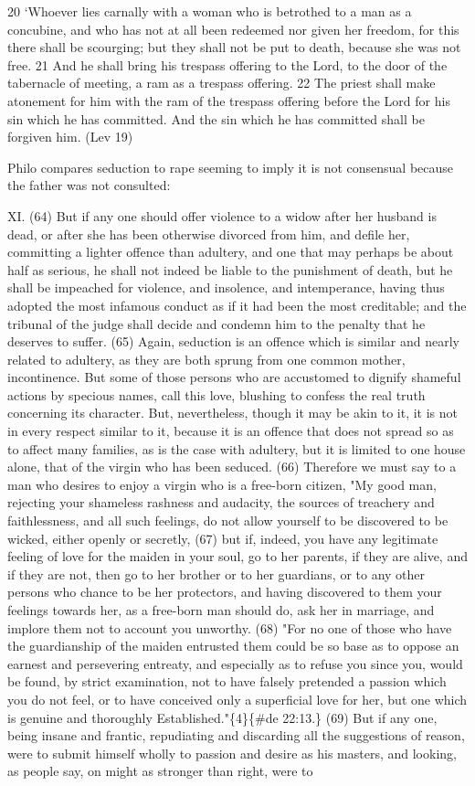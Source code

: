 \documentclass[11pt]{article}
\begin{document}
{20 ‘Whoever lies carnally with a woman who is betrothed to a man as a concubine, and who has not at all been redeemed nor given her freedom, for this there shall be scourging; but they shall not be put to death, because she was not free. 21 And he shall bring his trespass offering to the Lord, to the door of the tabernacle of meeting, a ram as a trespass offering. 22 The priest shall make atonement for him with the ram of the trespass offering before the Lord for his sin which he has committed. And the sin which he has committed shall be forgiven him. (Lev 19)

Philo compares seduction to rape seeming to imply it is not consensual because the father was not consulted:

XI. (64) But if any one should offer violence to a widow after her husband is dead, or after she has been otherwise divorced from him, and defile her, committing a lighter offence than adultery, and one that may perhaps be about half as serious, he shall not indeed be liable to the punishment of death, but he shall be impeached for violence, and insolence, and intemperance, having thus adopted the most infamous conduct as if it had been the most creditable; and the tribunal of the judge shall decide and condemn him to the penalty that he deserves to suffer. (65) Again, seduction is an offence which is similar and nearly related to adultery, as they are both sprung from one common mother, incontinence. But some of those persons who are accustomed to dignify shameful actions by specious names, call this love, blushing to confess the real truth concerning its character. But, nevertheless, though it may be akin to it, it is not in every respect similar to it, because it is an offence that does not spread so as to affect many families, as is the case with adultery, but it is limited to one house alone, that of the virgin who has been seduced. (66) Therefore we must say to a man who desires to enjoy a virgin who is a free-born citizen, "My good man, rejecting your shameless rashness and audacity, the sources of treachery and faithlessness, and all such feelings, do not allow yourself to be discovered to be wicked, either openly or secretly, (67) but if, indeed, you have any legitimate feeling of love for the maiden in your soul, go to her parents, if they are alive, and if they are not, then go to her brother or to her guardians, or to any other persons who chance to be her protectors, and having discovered to them your feelings towards her, as a free-born man should do, ask her in marriage, and implore them not to account you unworthy. (68) "For no one of those who have the guardianship of the maiden entrusted them could be so base as to oppose an earnest and persevering entreaty, and especially as to refuse you since you, would be found, by strict examination, not to have falsely pretended a passion which you do not feel, or to have conceived only a superficial love for her, but one which is genuine and thoroughly Established."\{4\}\{\#de 22:13.\} (69) But if any one, being insane and frantic, repudiating and discarding all the suggestions of reason, were to submit himself wholly to passion and desire as his masters, and looking, as people say, on might as stronger than right, were to }
\end{document}
